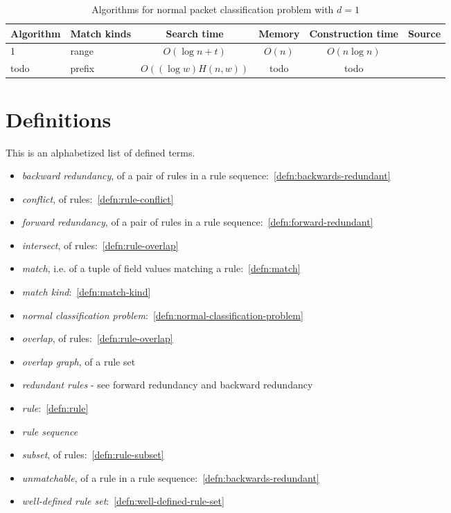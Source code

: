 \documentclass[acmsmall]{acmart}
\begin{document}
\begin{table*}
  \caption{Algorithms for normal packet classification problem with $d=1$}
  \label{tab:summarylpm}
  \begin{tabular}{llcccl}
    \toprule

      Algorithm
    & Match kinds
    & Search time
    & Memory
    & Construction time
    & Source \\

    \midrule

      1
    & range
    & $O(\log n + t)$
    & $O(n)$
    & $O(n \log n)$
    & \cite[Thm. 3.2]{Edel1983a}
    \\

      todo
    & prefix
    & $O((\log w) H(n,w))$
    & todo
    & todo
    & \cite{WVTP1997}
    \\

  \bottomrule
\end{tabular}
\end{table*}


\section{Definitions}

This is an alphabetized list of defined terms.
\begin{itemize}
\item {\em backward redundancy}, of a pair of rules in a rule sequence:~\ref{defn:backwards-redundant}
\item {\em conflict}, of rules:~\ref{defn:rule-conflict}
\item {\em forward redundancy}, of a pair of rules in a rule sequence:~\ref{defn:forward-redundant}
\item {\em intersect}, of rules:~\ref{defn:rule-overlap}
\item {\em match}, i.e. of a tuple of field values matching a rule:~\ref{defn:match}
\item {\em match kind}:~\ref{defn:match-kind}
\item {\em normal classification problem}:~\ref{defn:normal-classification-problem}
\item {\em overlap}, of rules:~\ref{defn:rule-overlap}
\item {\em overlap graph}, of a rule set
\item {\em redundant rules} - see forward redundancy and backward redundancy
\item {\em rule}:~\ref{defn:rule}
\item {\em rule sequence}
\item {\em subset}, of rules:~\ref{defn:rule-subset}
\item {\em unmatchable}, of a rule in a rule sequence:~\ref{defn:backwards-redundant}
\item {\em well-defined rule set}:~\ref{defn:well-defined-rule-set}
\end{itemize}
\end{document}
